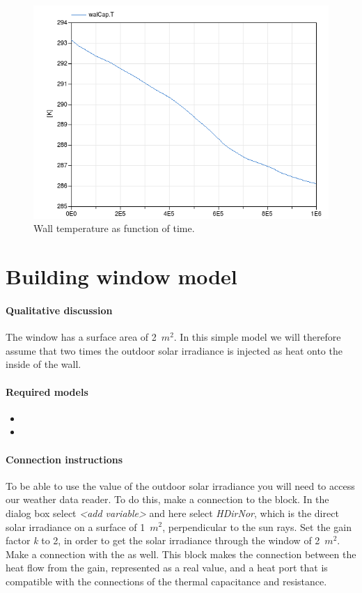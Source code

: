 \documentclass[10pt,a4paper]{article}
\begin{document}
\begin{figure}[h!]
\centering
\includegraphics[scale=0.6]{result1.png}
\caption{Wall temperature as function of time.}
\label{fig:res1}
\end{figure}

\newpage

\section{Building window model}
\paragraph{Qualitative discussion}
The window has a surface area of 2~$m^2$. 
In this simple model we will therefore assume that two times the
outdoor solar irradiance is injected as heat onto the inside of the wall.

\paragraph{Required models}
\begin{itemize}
\item {}
\item {}
\end{itemize}

\paragraph{Connection instructions}
To be able to use the value of the outdoor solar irradiance
you will need to access our weather data reader.
To do this, make a connection to the  block. 
In the dialog box select \textit{\textless add variable\textgreater} and here
select \textit{HDirNor}, 
which is the direct solar irradiance on a surface
of 1~$m^2$, perpendicular to the sun rays. Set the gain factor \textit{k} to 2, in order to get the solar irradiance through the window of 2~$m^2$. Make a connection with the  as well. This block makes the connection between the heat flow from the gain, represented as a real value, and a heat port that is compatible with the connections of the thermal capacitance and resistance. 
\end{document}
